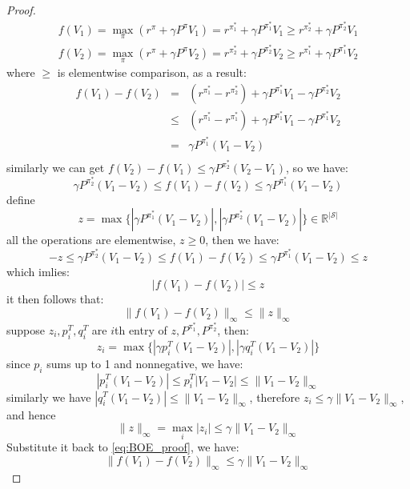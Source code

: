 \documentclass[10pt]{elegantbook}
\begin{document}
\begin{proof}
    \begin{align*}
        f(V_1) = \max_{\pi} (r^{\pi} + \gamma P^{\pi}V_1) = r^{\pi^*_1} + \gamma P^{\pi^*_1}V_1 \geq r^{\pi^*_2} + \gamma P^{\pi^*_2}V_1 \\
        f(V_2) = \max_{\pi} (r^{\pi} + \gamma P^{\pi}V_2) = r^{\pi^*_2} + \gamma P^{\pi^*_2}V_2 \geq r^{\pi^*_1} + \gamma P^{\pi^*_1}V_2
    \end{align*}
    where $\geq$ is elementwise comparison, as a result:
    \[ 
    \begin{array}{lll}
        f(V_1) - f(V_2) &=& (r^{\pi^*_1} - r^{\pi^*_2}) + \gamma P^{\pi^*_1}V_1 - \gamma P^{\pi^*_2}V_2 \\
                        &\leq& (r^{\pi^*_1} - r^{\pi^*_1}) + \gamma P^{\pi^*_1}V_1 - \gamma P^{\pi^*_1}V_2 \\
                        &=& \gamma P^{\pi^*_1}(V_1 - V_2) \\
    \end{array}    
    \]
    similarly we can get $f(V_2) - f(V_1) \leq \gamma P^{\pi^*_2}(V_2 - V_1)$, so we have:
    \[ \gamma P^{\pi^*_2}(V_1 - V_2) \leq f(V_1) - f(V_2) \leq \gamma P^{\pi^*_1}(V_1 - V_2) \]
    define
    \[ z = \max \big \{ | \gamma P^{\pi^*_1}(V_1 - V_2) |, | \gamma P^{\pi^*_2}(V_1 - V_2) | \big \} \in \mathbb R^{|\mathcal S|} \]
    all the operations are elementwise, $z \geq 0$, then we have:
    \[ -z \leq \gamma P^{\pi^*_2}(V_1 - V_2) \leq f(V_1) - f(V_2) \leq \gamma P^{\pi^*_1}(V_1 - V_2) \leq z \]
    which imlies:
    \[ |f(V_1) - f(V_2)| \leq z \]
    it then follows that:
    \begin{equation} \label{eq:BOE_proof}
        \| f(V_1) - f(V_2) \|_{\infty} \leq \| z \|_{\infty}
    \end{equation}
    suppose $z_i, p_i^T, q_i^T$ are $i$th entry of $z, P^{\pi^*_1}, P^{\pi^*_2}$, then:
    \[ z_i = \max \big \{ |\gamma p_i^T(V_1 - V_2)|, |\gamma q_i^T(V_1 - V_2)| \big \} \]
    since $p_i$ sums up to 1 and nonnegative, we have:
    \[ |p_i^T (V_1 - V_2) | \leq p_i^T |V_1 - V_2| \leq \| V_1 - V_2 \|_{\infty} \]
    similarly we have $|q_i^T (V_1 - V_2) | \leq \| V_1 - V_2 \|_{\infty}$, therefore $z_i \leq \gamma \| V_1 - V_2 \|_{\infty}$, and hence
    \[ \| z \|_{\infty} = \max_i |z_i| \leq \gamma \| V_1 - V_2 \|_{\infty} \]
    Substitute it back to \ref{eq:BOE_proof}, we have:
    \[ \| f(V_1) - f(V_2) \|_{\infty} \leq \gamma \| V_1 - V_2 \|_{\infty} \]
\end{proof}
\end{document}
